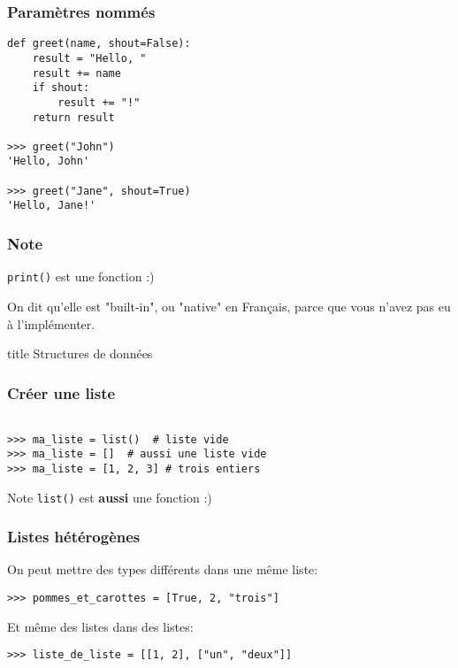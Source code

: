 \documentclass{beamer}
\begin{document}
\begin{frame}[fragile]
  \frametitle{Paramètres nommés}
\begin{lstlisting}
def greet(name, shout=False):
    result = "Hello, "
    result += name
    if shout:
        result += "!"
    return result

>>> greet("John")
'Hello, John'

>>> greet("Jane", shout=True)
'Hello, Jane!'
\end{lstlisting}


\end{frame}

\begin{frame}[fragile]
  \frametitle{Note}
\texttt{print()} est une fonction :)

\vfill

On dit qu'elle est "built-in", ou "native" en Français,
parce que vous n'avez pas eu à l'implémenter.

\end{frame}


\begin{frame}[fragile]
  \begin{beamercolorbox}[sep=8pt,center,shadow=true,rounded=true]{title}
    Structures de données
  \end{beamercolorbox}
\end{frame}

\begin{frame}[fragile]
  \frametitle{Créer une liste}
\begin{lstlisting}

>>> ma_liste = list()  # liste vide
>>> ma_liste = []  # aussi une liste vide
>>> ma_liste = [1, 2, 3] # trois entiers

\end{lstlisting}

\vfill

\begin{alertblock}{Note}
  \texttt{list()} est \textbf{aussi} une fonction :)
\end{alertblock}

\end{frame}

\begin{frame}[fragile]
  \frametitle{Listes hétérogènes}

On peut mettre des types différents dans une même liste:

\begin{lstlisting}
>>> pommes_et_carottes = [True, 2, "trois"]
\end{lstlisting}

\vfill
Et même des listes dans des listes:

\begin{lstlisting}
>>> liste_de_liste = [[1, 2], ["un", "deux"]]
\end{lstlisting}


\end{frame}
\end{document}
